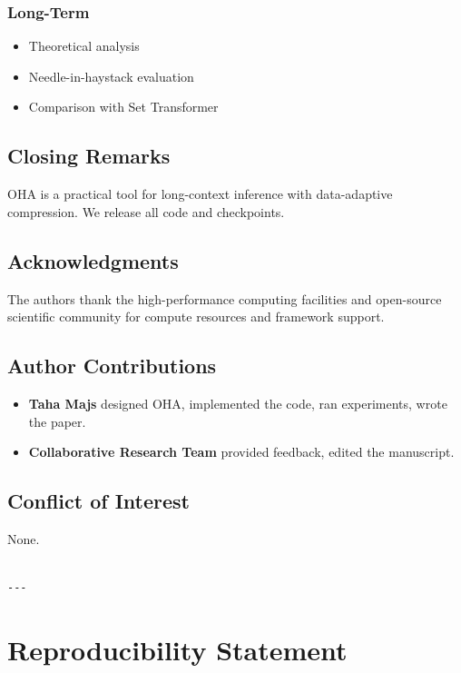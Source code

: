 \subsubsection{Long-Term}
\begin{itemize}
\item Theoretical analysis
\item Needle-in-haystack evaluation
\item Comparison with Set Transformer

\end{itemize}
\subsection{Closing Remarks}

OHA is a practical tool for long-context inference with data-adaptive 
compression. We release all code and checkpoints.

\subsection{Acknowledgments}

The authors thank the high-performance computing facilities and open-source scientific community for compute resources and framework support.

\subsection{Author Contributions}

\begin{itemize}
\item \textbf{Taha Majs} designed OHA, implemented the code, ran experiments,
  wrote the paper.
\item \textbf{Collaborative Research Team} provided feedback, edited the manuscript.

\end{itemize}
\subsection{Conflict of Interest}

None.
\begin{lstlisting}

---
\end{lstlisting}


\section{Reproducibility Statement}


